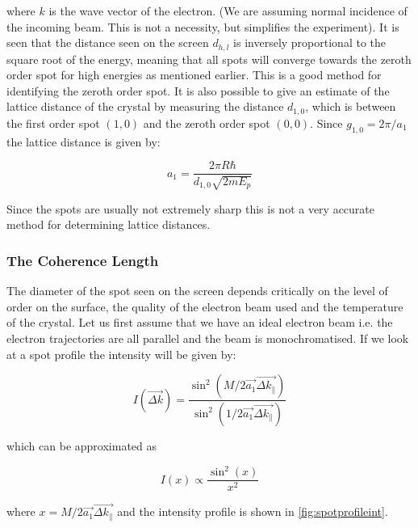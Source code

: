 \noindent where $k$ is the wave vector of the electron. (We are assuming normal incidence of the incoming beam. This is not a necessity, but simplifies the experiment). It is seen that the distance seen on the screen $d_{h,l}$ is inversely proportional to the  square root of the energy, meaning that all spots will converge towards the zeroth order spot for high energies as mentioned earlier. This is a good method for identifying  the zeroth order spot. It is also possible to give an estimate of the lattice distance of the crystal by measuring the distance $d_{1,0}$, which is between the first order spot $(1,0)$ and the zeroth order spot $(0,0)$. Since $g_{1,0}=2\pi/a_1$ the lattice distance is given by:

\begin{equation}
a_1=\frac{2\pi R\hbar}{d_{1,0}\sqrt{2mE_p}}
\end{equation}

Since the spots are usually not extremely sharp this is not a very accurate method for determining lattice distances.

\subsubsection{The Coherence Length}
The diameter of the spot seen on the screen depends critically on the level of order on the surface, the quality of the electron beam used and the temperature of the crystal. Let us first assume that we have an ideal electron beam i.e. the electron trajectories are all parallel and the beam is monochromatised. If we look at a spot profile the intensity will be given by:

\begin{equation}
I\left(\vec{\Delta k}\right)=\frac{\sin^2\left(M/2 \vec{a_1}\vec{\Delta k_{\parallel}}\right)}{\sin^2\left(1/2\vec{a_1}\vec{\Delta k_{\parallel}}\right)}
\end{equation}

\noindent which can be approximated as

\begin{equation}
I(x)\propto\frac{\sin^2(x)}{x^2}
\end{equation}

\noindent where $x=M/2\vec{a_1}\vec{\Delta k_{\parallel}}$ and the intensity profile is shown in \autoref{fig:spotprofileint}.

